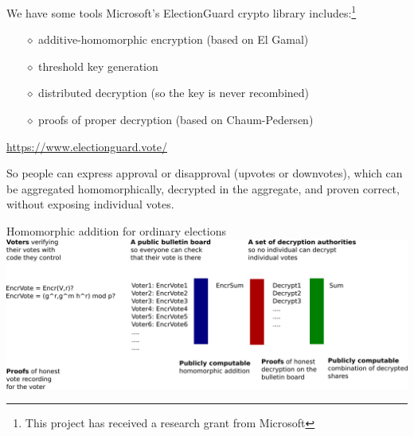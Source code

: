 \documentclass[10pt,xcolor=svgnames,169]{beamer} %
\begin{document}
	\begin{frame}[fragile]{We have some tools} %
		Microsoft's ElectionGuard crypto library includes:\footnote{This project has received a research grant from Microsoft} %
		\begin{itemize} %
			\item[$\diamond$] additive-homomorphic encryption (based on El Gamal)
			\item[$\diamond$] threshold key generation
			\item[$\diamond$] distributed decryption (so the key is never recombined)
			\item[$\diamond$] proofs of proper decryption (based on Chaum-Pedersen)
		\end{itemize}
	
		\url{https://www.electionguard.vote/}

	So people can express approval or disapproval (upvotes or downvotes), which can be aggregated homomorphically, decrypted in the aggregate, and proven correct, without exposing individual votes.
		
	\end{frame}
	
		\begin{frame}[fragile]{Homomorphic addition for ordinary elections}
	\includegraphics[scale=0.17]{e2e-vVoting-homomorphicAddition.png}
\end{frame}
\end{document}

